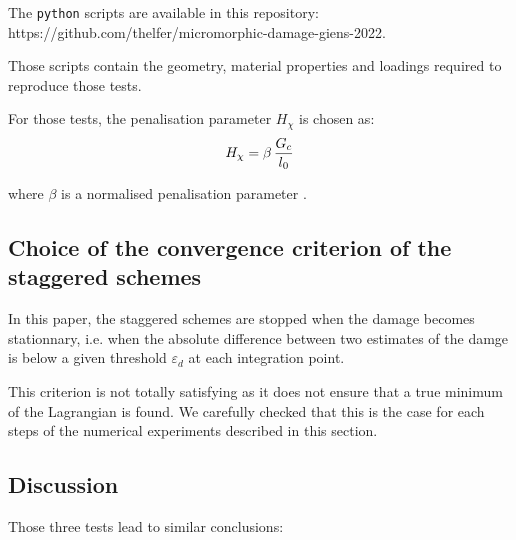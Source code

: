 The \texttt{python} scripts are available in this repository:
https://github.com/thelfer/micromorphic-damage-giens-2022.

Those scripts contain the geometry, material properties and loadings
required to reproduce those tests.

For those tests, the penalisation parameter \(H_{\chi}\) is chosen as:
\[
H_{\chi}= \beta\,\displaystyle \frac{\displaystyle G_{c}}{\displaystyle l_{0}}
\]

where \(\beta\) is a normalised penalisation parameter \cite{bharali_computational_2021}.

\subsection{Choice of the convergence criterion of the staggered schemes}

In this paper, the staggered schemes are stopped when the damage becomes
stationnary, i.e. when the absolute difference between two estimates of
the damge is below a given threshold \(\varepsilon_{d}\) at each
integration point.

This criterion is not totally satisfying as it does not ensure that a
true minimum of the Lagrangian is found. We carefully checked that this
is the case for each steps of the numerical experiments described in
this section.

\subsection{Discussion}

Those three tests lead to similar conclusions:


